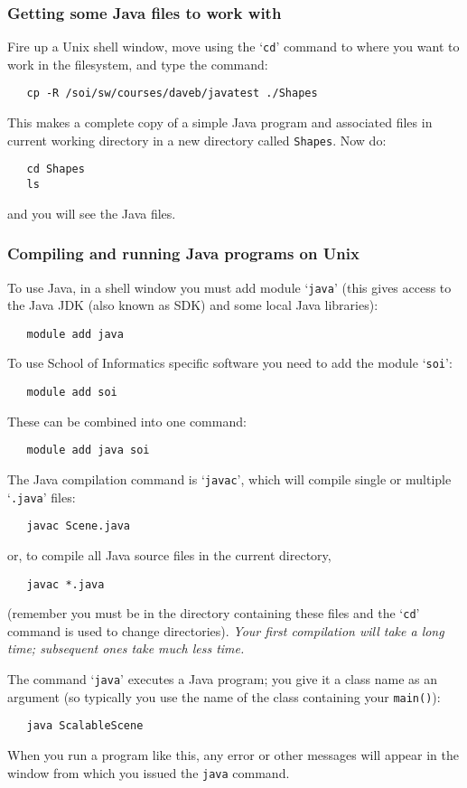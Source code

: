 \documentclass{article}
\begin{document}
\subsubsection*{Getting some Java files to work with}

Fire up a Unix shell window,
move using the `\verb+cd+' command
to where you want to work in 
the filesystem, and type the command:
\begin{verbatim}
   cp -R /soi/sw/courses/daveb/javatest ./Shapes
\end{verbatim}
This makes a complete copy
of a simple Java program and associated files in 
current working directory in a new directory called \verb+Shapes+.
Now do:
\begin{verbatim}
   cd Shapes
   ls
\end{verbatim}
and you will see the Java files.


\subsubsection*{Compiling and running Java programs on Unix}

To use Java, in a shell window
you must add module `\verb+java+' (this 
gives access to the Java JDK (also known as 
SDK) and some local Java libraries):
\begin{verbatim}
   module add java
\end{verbatim}
To use School of Informatics specific software you 
need to add the module `\verb+soi+':
\begin{verbatim}
   module add soi
\end{verbatim}
These can be combined into one command:
\begin{verbatim}
   module add java soi
\end{verbatim}
The Java compilation command is `\verb+javac+', which will compile 
single or multiple `\verb+.java+' files: 
\begin{verbatim}
   javac Scene.java
\end{verbatim}
or, to compile all Java source files in the current directory,
\begin{verbatim}
   javac *.java
\end{verbatim}
(remember you must be in the directory containing these
files and the `\verb+cd+' command is used to change directories).
\emph{Your first compilation will take a long time; subsequent ones
take much less time.}

The command `\verb+java+' executes a Java program;
you give it a class name as an argument (so typically
you use the name of the class containing your \verb+main()+):
\begin{verbatim}
   java ScalableScene
\end{verbatim}
When you run a program like this, any error or other messages will 
appear in the window from which you issued the \verb+java+ command.
\end{document}
